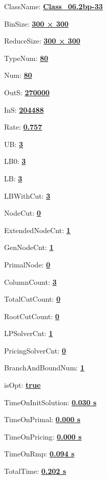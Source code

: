 \documentclass[11pt]{article}
\begin{document}
\pagestyle{empty}


ClassName: \underline{\textbf{Class_06.2bp-33}}
\par
BinSize: \underline{\textbf{300 × 300}}
\par
ReduceSize: \underline{\textbf{300 × 300}}
\par
TypeNum: \underline{\textbf{80}}
\par
Num: \underline{\textbf{80}}
\par
OutS: \underline{\textbf{270000}}
\par
InS: \underline{\textbf{204488}}
\par
Rate: \underline{\textbf{0.757}}
\par
UB: \underline{\textbf{3}}
\par
LB0: \underline{\textbf{3}}
\par
LB: \underline{\textbf{3}}
\par
LBWithCut: \underline{\textbf{3}}
\par
NodeCut: \underline{\textbf{0}}
\par
ExtendedNodeCnt: \underline{\textbf{1}}
\par
GenNodeCnt: \underline{\textbf{1}}
\par
PrimalNode: \underline{\textbf{0}}
\par
ColumnCount: \underline{\textbf{3}}
\par
TotalCutCount: \underline{\textbf{0}}
\par
RootCutCount: \underline{\textbf{0}}
\par
LPSolverCnt: \underline{\textbf{1}}
\par
PricingSolverCnt: \underline{\textbf{0}}
\par
BranchAndBoundNum: \underline{\textbf{1}}
\par
isOpt: \underline{\textbf{true}}
\par
TimeOnInitSolution: \underline{\textbf{0.030 s}}
\par
TimeOnPrimal: \underline{\textbf{0.000 s}}
\par
TimeOnPricing: \underline{\textbf{0.000 s}}
\par
TimeOnRmp: \underline{\textbf{0.094 s}}
\par
TotalTime: \underline{\textbf{0.202 s}}
\par
\newpage
\end{document}

